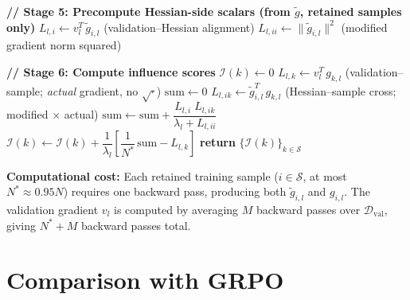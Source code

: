 \documentclass{article}
\begin{document}
\begin{algorithm}[H]
\begin{algorithmic}[1]
\STATE
\STATE \textbf{// Stage 5: Precompute Hessian-side scalars (from $\tilde{g}$, retained samples only)}
        \STATE $L_{l,i} \leftarrow v_l^T\,\tilde{g}_{i,l}$
        \hfill (validation--Hessian alignment)
        \STATE $L_{l,ii} \leftarrow \|\tilde{g}_{i,l}\|^2$
        \hfill (modified gradient norm squared)
    \ENDFOR
\ENDFOR

\STATE
\STATE \textbf{// Stage 6: Compute influence scores}
    \STATE $\mathcal{I}(k) \leftarrow 0$
        \STATE $L_{l,k} \leftarrow v_l^T\,g_{k,l}$
        \hfill (validation--sample; \emph{actual} gradient, no $\sqrt{\cdot}$)
        \STATE $\mathrm{sum} \leftarrow 0$
            \STATE $L_{l,ik} \leftarrow \tilde{g}_{i,l}^T\,g_{k,l}$
            \hfill (Hessian--sample cross; modified $\times$ actual)
            \STATE $\mathrm{sum} \leftarrow \mathrm{sum} + \dfrac{L_{l,i}\;L_{l,ik}}{\lambda_l + L_{l,ii}}$
        \ENDFOR
        \STATE $\mathcal{I}(k) \leftarrow \mathcal{I}(k) + \dfrac{1}{\lambda_l}\!\left[\dfrac{1}{N^*}\,\mathrm{sum} - L_{l,k}\right]$
    \ENDFOR
\ENDFOR
\STATE \textbf{return} $\{\mathcal{I}(k)\}_{k\in\mathcal{S}}$
\end{algorithmic}
\end{algorithm}

\textbf{Computational cost:} Each retained training sample ($i \in \mathcal{S}$, at most $N^* \approx 0.95N$) requires one backward pass, producing both $\tilde{g}_{i,l}$ and $g_{i,l}$.
The validation gradient $v_l$ is computed by averaging $M$ backward passes over $\mathcal{D}_{\mathrm{val}}$, giving $N^*+M$ backward passes total.

\section{Comparison with GRPO}
\end{document}
